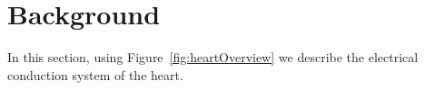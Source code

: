 \section{Background }


In this section, using Figure~\ref{fig:heartOverview} we 
describe the electrical conduction system of the heart.
	
\begin{figure*}[htbp]
	\centering
	
	\caption{Electrical conduction systems of a heart}
	\label{fig:heartOverview}
\end{figure*}